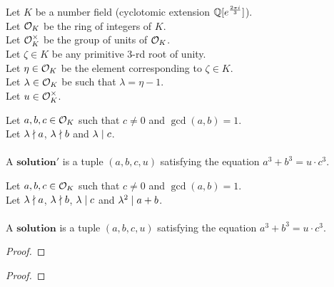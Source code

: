 Let $K$ be a number field (cyclotomic extension $\mathbb{Q}[e^{\frac{2\pi i}{3}}]$). \\
Let $\mathcal{O}_K$ be the ring of integers of $K$. \\
Let $\mathcal{O}^\times_K$ be the group of units of $\mathcal{O}_K$. \\
Let $\zeta \in K$ be any primitive $3$-rd root of unity. \\
Let $\eta \in \mathcal{O}_K$ be the element corresponding to $\zeta \in K$. \\
Let $\lambda \in \mathcal{O}_K$ be such that $\lambda = \eta -1$. \\
Let $u \in \mathcal{O}^\times_K$.

\begin{definition}[Solution']
    \label{def:Solution1}
    \leanok
    Let $a, b, c \in \mathcal{O}_K$ such that $c \neq 0$ and $\gcd(a,b)=1$.\\
    Let $\lambda \nmid a$, $\lambda \nmid b$ and $\lambda \mid c$. \\\\
    A $\boldsymbol{solution'}$ is a tuple $(a, b, c, u)$
    satisfying the equation $a^3 + b^3 = u \cdot c^3.$
\end{definition}

\begin{definition}[Solution]
    \label{def:Solution}
    \leanok
    Let $a, b, c \in \mathcal{O}_K$ such that $c \neq 0$ and $\gcd(a,b)=1$.\\
    Let $\lambda \nmid a$, $\lambda \nmid b$, $\lambda \mid c$ and
    $\lambda^2 \mid a+b$. \\\\
    A $\boldsymbol{solution}$ is a tuple $(a, b, c, u)$
    satisfying the equation $a^3 + b^3 = u \cdot c^3$.
\end{definition}

\begin{lemma}
    \label{lmm:Solution1.multiplicity_lambda_c_finite}
    \leanok
\end{lemma}
\begin{proof}
    \leanok
\end{proof}

\begin{lemma}
    \label{lmm:exists_minimal}
    \leanok
\end{lemma}
\begin{proof}
    \leanok
\end{proof}

